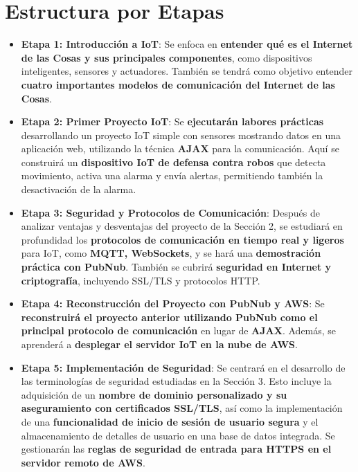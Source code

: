 \documentclass{report}
\begin{document}
\newpage
\section{Estructura por Etapas}
    \begin{itemize}
        \item \textbf{Etapa 1: Introducción a IoT}: Se enfoca en \textbf{entender qué es el Internet de las Cosas y sus principales componentes}, como 
              dispositivos inteligentes, sensores y actuadores. También se tendrá como objetivo entender \textbf{cuatro importantes modelos de 
              comunicación del Internet de las Cosas}.
        \item \textbf{Etapa 2: Primer Proyecto IoT}: Se \textbf{ejecutarán labores prácticas} desarrollando un proyecto IoT simple con sensores
              mostrando datos en una aplicación web, utilizando la técnica \textbf{AJAX} para la comunicación. Aquí se construirá un 
              \textbf{dispositivo IoT de defensa contra robos} que detecta movimiento, activa una alarma y envía alertas, permitiendo también la desactivación
              de la alarma.
        \item \textbf{Etapa 3: Seguridad y Protocolos de Comunicación}: Después de analizar ventajas y desventajas del proyecto de la Sección 2, se 
              estudiará en profundidad los \textbf{protocolos de comunicación en tiempo real y ligeros} para IoT, como \textbf{MQTT, WebSockets}, y se hará
              una \textbf{demostración práctica con PubNub}. También se cubrirá \textbf{seguridad en Internet y criptografía}, incluyendo SSL/TLS y 
              protocolos HTTP.
        \item \textbf{Etapa 4: Reconstrucción del Proyecto con PubNub y AWS}: Se \textbf{reconstruirá el proyecto anterior utilizando PubNub como el 
              principal protocolo de comunicación} en lugar de \textbf{AJAX}. Además, se aprenderá a \textbf{desplegar el servidor IoT en la nube de AWS}.
        \item \textbf{Etapa 5: Implementación de Seguridad}: Se centrará en el desarrollo de las terminologías de seguridad estudiadas en la Sección 3. 
              Esto incluye la adquisición de un \textbf{nombre de dominio personalizado y su aseguramiento con certificados SSL/TLS}, 
              así como la implementación de una \textbf{funcionalidad de inicio de sesión de usuario segura} y el almacenamiento de detalles de usuario 
              en una base de datos integrada. Se gestionarán las \textbf{reglas de seguridad de entrada para HTTPS en el servidor remoto de AWS}.

\end{itemize}
\end{document}
